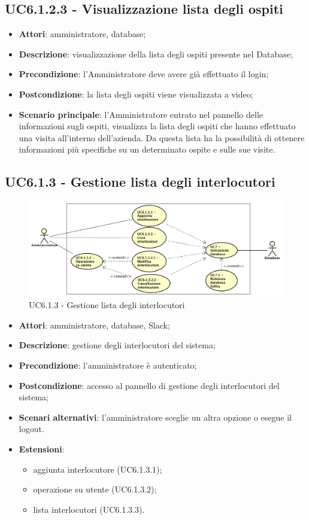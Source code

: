 \documentclass[../AnalisiDeiRequisiti.tex]{subfiles}
\begin{document}
\subsection{UC6.1.2.3 - Visualizzazione lista degli ospiti} 
\label{sssec:UC6.1.2.3} 
\begin{itemize} 
\item \textbf{Attori}: amministratore, database;
\item \textbf{Descrizione}: visualizzazione della lista degli ospiti presente nel Database;
\item \textbf{Precondizione}: l'Amministratore deve avere già effettuato il login;
\item \textbf{Postcondizione}: la lista degli ospiti viene visualizzata a video;
\item \textbf{Scenario principale}: l'Amministratore entrato nel pannello delle informazioni sugli ospiti, visualizza la lista degli ospiti che hanno effettuato una visita all'interno dell'azienda. Da questa lista ha la possibilità di ottenere informazioni più specifiche su un determinato ospite e sulle sue visite.\end{itemize}
\newpage
\subsection{UC6.1.3 - Gestione lista degli interlocutori}
\begin{figure}[!h]
	\centering
	\includegraphics[width=\textwidth]{UseCases/UC6-Amministrazione/Immagini/UCGestioneListaDegliInterlocutori.png}
	\caption{UC6.1.3 - Gestione lista degli interlocutori}
\end{figure}	
\label{sssec:UC6.1.3} 
\begin{itemize} 
\item \textbf{Attori}: amministratore, database, Slack;
\item \textbf{Descrizione}: gestione degli interlocutori del sistema;
\item \textbf{Precondizione}: l'amministratore è autenticato;
\item \textbf{Postcondizione}: accesso al pannello di gestione degli interlocutori del sistema;
\item \textbf{Scenari alternativi}: l'amministratore sceglie un altra opzione o esegue il logout.
\item \textbf{Estensioni}:\begin{itemize}\item aggiunta interlocutore (UC6.1.3.1);\item operazione su utente (UC6.1.3.2);\item lista interlocutori (UC6.1.3.3).\end{itemize}
\end{itemize} 
\end{document}

